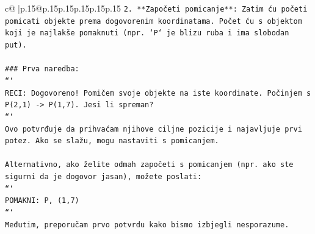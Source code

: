\documentclass{article}
\begin{document}
{\begin{supertabular}{c@{$\;$}|p{.15\linewidth}@{}p{.15\linewidth}p{.15\linewidth}p{.15\linewidth}p{.15\linewidth}p{.15\linewidth}}
{{{\texttt{2. **Započeti pomicanje**: Zatim ću početi pomicati objekte prema dogovorenim koordinatama. Počet ću s objektom koji je najlakše pomaknuti (npr. `P` je blizu ruba i ima slobodan put).} \\
\\ 
\texttt{\#\#\# Prva naredba:} \\
\texttt{```} \\
\texttt{RECI: Dogovoreno! Pomičem svoje objekte na iste koordinate. Počinjem s P(2,1) {-}> P(1,7). Jesi li spreman?} \\
\texttt{```} \\
\texttt{Ovo potvrđuje da prihvaćam njihove ciljne pozicije i najavljuje prvi potez. Ako se slažu, mogu nastaviti s pomicanjem.} \\
\\ 
\texttt{Alternativno, ako želite odmah započeti s pomicanjem (npr. ako ste sigurni da je dogovor jasan), možete poslati:} \\
\texttt{```} \\
\texttt{POMAKNI: P, (1,7)} \\
\texttt{```} \\
\texttt{Međutim, preporučam prvo potvrdu kako bismo izbjegli nesporazume.} \\
            }
        }
    }
     \\ \\


\end{supertabular}}
\end{document}
